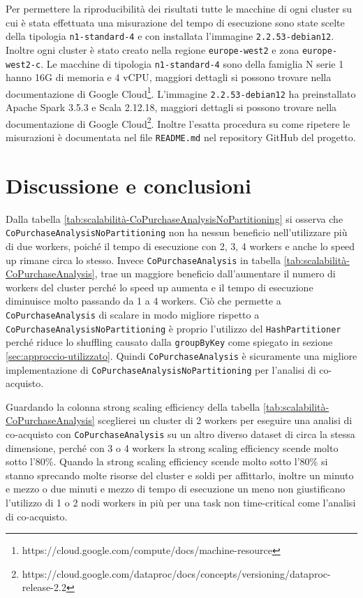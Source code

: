 \documentclass{article}
\begin{document}
Per permettere la riproducibilità dei risultati tutte le macchine di ogni cluster su cui è stata effettuata una misurazione del tempo di esecuzione sono state scelte della tipologia \verb|n1-standard-4| e con installata l'immagine \verb|2.2.53-debian12|.
Inoltre ogni cluster è stato creato nella regione \verb|europe-west2| e zona \verb|europe-west2-c|.
Le macchine di tipologia \verb|n1-standard-4| sono della famiglia N serie 1 hanno 16G di memoria e 4 vCPU, maggiori dettagli si possono trovare nella documentazione di Google Cloud\footnote{https://cloud.google.com/compute/docs/machine-resource}.
L'immagine \verb|2.2.53-debian12| ha preinstallato Apache Spark 3.5.3 e Scala 2.12.18, maggiori dettagli si possono trovare nella documentazione di Google Cloud\footnote{https://cloud.google.com/dataproc/docs/concepts/versioning/dataproc-release-2.2}.
Inoltre l'esatta procedura su come ripetere le misurazioni è documentata nel file \verb|README.md| nel repository GitHub del progetto.

\section{Discussione e conclusioni} \label{sec:discussione-e-conclusioni}

Dalla tabella \ref{tab:scalabilità-CoPurchaseAnalysisNoPartitioning} si osserva che \verb|CoPurchaseAnalysisNoPartitioning| non ha nessun beneficio nell'utilizzare più di due workers, poiché il tempo di esecuzione con 2, 3, 4 workers e anche lo speed up rimane circa lo stesso.
Invece \verb|CoPurchaseAnalysis| in tabella \ref{tab:scalabilità-CoPurchaseAnalysis}, trae un maggiore beneficio dall'aumentare il numero di workers del cluster perché lo speed up aumenta e il tempo di esecuzione diminuisce molto passando da 1 a 4 workers.
Ciò che permette a \verb|CoPurchaseAnalysis| di scalare in modo migliore rispetto a \verb|CoPurchaseAnalysisNoPartitioning| è proprio l'utilizzo del \verb|HashPartitioner| perché riduce lo shuffling causato dalla \verb|groupByKey| come spiegato in sezione \ref{sec:approccio-utilizzato}.
Quindi \verb|CoPurchaseAnalysis| è sicuramente una migliore implementazione di \verb|CoPurchaseAnalysisNoPartitioning| per l'analisi di co-acquisto.

Guardando la colonna strong scaling efficiency della tabella \ref{tab:scalabilità-CoPurchaseAnalysis} sceglierei un cluster di 2 workers per eseguire una analisi di co-acquisto con \verb|CoPurchaseAnalysis| su un altro diverso dataset di circa la stessa dimensione, perché con 3 o 4 workers la strong scaling efficiency scende molto sotto l'80\%. 
Quando la strong scaling efficiency scende molto sotto l'80\% si stanno sprecando molte risorse del cluster e soldi per affittarlo, inoltre un minuto e mezzo o due minuti e mezzo di tempo di esecuzione un meno non giustificano l'utilizzo di 1 o 2 nodi workers in più per una task non time-critical come l'analisi di co-acquisto.
\end{document}

